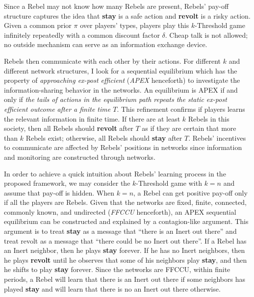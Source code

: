 \documentclass[12pt,letterpaper]{article}
\newtheorem*{main result}{Main Result}
\theoremstyle{definition}
\theoremstyle{remark}
\theoremstyle{claim}
\begin{document}
Since a Rebel may not know how many Rebels are present, Rebels' pay-off structure captures the idea that \textbf{stay} is a safe action and \textbf{revolt} is a risky action. Given a common prior $\pi$ over players' types, players play this $k$-Threshold game infinitely repeatedly with a common discount factor $\delta$. Cheap talk is not allowed; no outside mechanism can serve as an information exchange device. 


Rebels then communicate with each other by their actions. For different $k$ and different network structures, I look for a sequential equilibrium which has the property of \textit{approaching ex-post efficient} (\textit{APEX} henceforth) to investigate the information-sharing behavior in the networks. An equilibrium is APEX if and only if \textit{the tails of actions in the equilibrium path repeats the static ex-post efficient outcome after a finite time $T$}. This refinement confirms if players learns the relevant information in finite time. If there are at least $k$ Rebels in this society, then all Rebels should \textbf{revolt} after $T$ as if they are certain that more than $k$ Rebels exist; otherwise, all Rebels should \textbf{stay} after $T$. Rebels' incentives to communicate are affected by Rebels' positions in networks since information and monitoring are constructed through networks.

In order to achieve a quick intuition about Rebels' learning process in the proposed framework, we may consider the $k$-Threshold game with $k=n$ and assume that pay-off is hidden. When $k=n$, a Rebel can get positive pay-off only if all the players are Rebels. Given that the networks are fixed, finite, connected, commonly known, and undirected (\textit{FFCCU} henceforth), an APEX sequential equilibrium can be constructed and explained by a contagion-like argument. This argument is to treat \textbf{stay} as a message that ``there is an Inert out there'' and treat revolt as a message that ``there could be no Inert out there''. If a Rebel has an Inert neighbor, then he plays \textbf{stay} forever. If he has no Inert neighbors, then he plays \textbf{revolt} until he observes that some of his neighbors play \textbf{stay}, and then he shifts to play \textbf{stay} forever. Since the networks are FFCCU, within finite periods, a Rebel will learn that there is an Inert out there if some neighbors has played \textbf{stay} and will learn that there is no an Inert out there otherwise.
\end{document}
